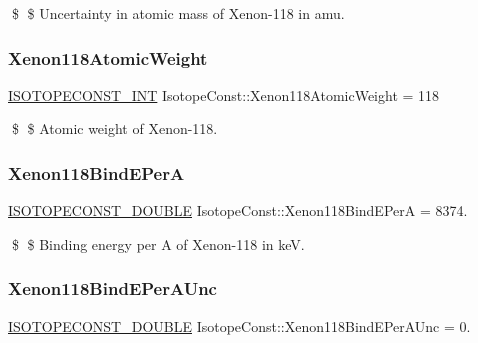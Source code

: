\$ \$ Uncertainty in atomic mass of Xenon-\/118 in amu. \mbox{\label{group___isotope_const-_xenon-_xe118_ga2884a2c60bc9b7ad8f99cf633fb41020}} 
\subsubsection{\texorpdfstring{Xenon118\+Atomic\+Weight}{Xenon118AtomicWeight}}
{\footnotesize\ttfamily \mbox{\hyperlink{group___isotope_const-_macros_ga5f18360b3e99483a35c32d789e62621c}{I\+S\+O\+T\+O\+P\+E\+C\+O\+N\+S\+T\+\_\+\+I\+NT}} Isotope\+Const\+::\+Xenon118\+Atomic\+Weight = 118}

\$ \$ Atomic weight of Xenon-\/118. \mbox{\label{group___isotope_const-_xenon-_xe118_gad03384c38699be306f30892f2bebad13}} 
\subsubsection{\texorpdfstring{Xenon118\+Bind\+E\+PerA}{Xenon118BindEPerA}}
{\footnotesize\ttfamily \mbox{\hyperlink{group___isotope_const-_macros_ga8f45a7272ce02c0b4c65c44636ed719a}{I\+S\+O\+T\+O\+P\+E\+C\+O\+N\+S\+T\+\_\+\+D\+O\+U\+B\+LE}} Isotope\+Const\+::\+Xenon118\+Bind\+E\+PerA = 8374.}

\$ \$ Binding energy per A of Xenon-\/118 in keV. \mbox{\label{group___isotope_const-_xenon-_xe118_gaf35d782da835e731b0ae8aeeb3ac61fa}} 
\subsubsection{\texorpdfstring{Xenon118\+Bind\+E\+Per\+A\+Unc}{Xenon118BindEPerAUnc}}
{\footnotesize\ttfamily \mbox{\hyperlink{group___isotope_const-_macros_ga8f45a7272ce02c0b4c65c44636ed719a}{I\+S\+O\+T\+O\+P\+E\+C\+O\+N\+S\+T\+\_\+\+D\+O\+U\+B\+LE}} Isotope\+Const\+::\+Xenon118\+Bind\+E\+Per\+A\+Unc = 0.}

